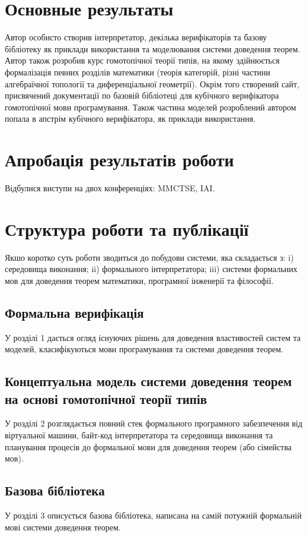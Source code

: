 \section*{Основные результаты}
Автор особисто створив інтерпретатор, декілька верифікаторів та базову бібліотеку
як приклади використання та моделювання системи доведення теорем. Автор також
розробив курс гомотопічної теорії типів, на якому здійнюється формалізація
певних розділів математики (теорія категорій, різні частини алгебраїчної
топології та диференціальної геометрії). Окрім того створений сайт, присвячений
документації по базовій бібліотеці для кубічного верифікатора гомотопічної мови
програмування. Також частина моделей розроблений автором попала в
апстрім кубічного верифікатора, як приклади використання.

\section*{Апробація результатів роботи}
Відбулися виступи на двох конференціях: MMCTSE, IAI.

\section*{Структура роботи та публікації}
Якшо коротко суть роботи зводиться до побудови системи, яка складається з:
i) середовища виконання; ii) формального інтерпретатора; iii) системи формальних мов
для доведення теорем математики, програмної інженерії та філософії.

\subsection*{Формальна верифікація}

У розділі 1 дається огляд існуючих рішень для доведення
властивостей систем та моделей, класифікуються мови програмування
та системи доведення теорем.

\subsection*{Концептуальна модель системи доведення теорем на основі гомотопічної теорії типів}
У розділі 2 розглядається повний стек формального програмного забезпечення
від віртуальної машини, байт-код інтерпретатора та середовища виконання
та планування процесів до формальної мови для доведення теорем (або сімейства мов).

\subsection*{Базова бібліотека}
У розділі 3 описується базова бібліотека, написана на самій потужній
формальній мові системи доведення теорем.


